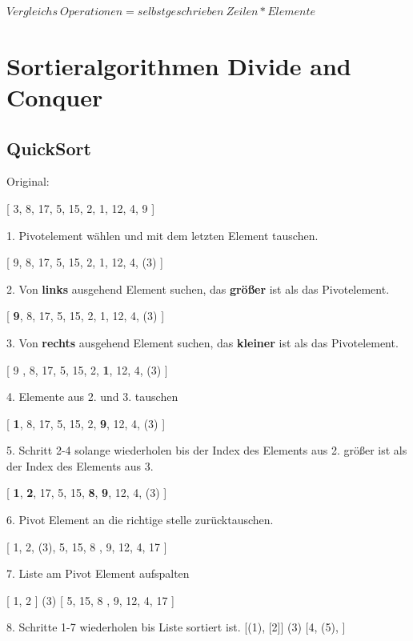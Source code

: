 \documentclass[12pt]{article}
\begin{document}
		\begin{center}
		$Vergleichs \ Operationen = selbst geschrieben \ Zeilen * Elemente$
	\end{center}
\newpage
\section{Sortieralgorithmen Divide and Conquer}
\subsection{QuickSort}
\begin{center}
	Original:
\end{center}
\vspace{-0.8cm}
 \begin{center}
 	

 [ 3, 8, 17, 5, 15, 2, 1, 12, 4, 9 ]
 \end{center}
1. Pivotelement wählen und mit dem letzten Element tauschen.
 \begin{center}
	[ 9, 8, 17, 5, 15, 2, 1, 12, 4, (3) ]
\end{center}
2. Von \textbf{links} ausgehend Element suchen, das \textbf{größer} ist als das Pivotelement.

 \begin{center}
	[ \textbf{9}, 8, 17, 5, 15, 2, 1, 12, 4, (3) ]
\end{center}

3. Von \textbf{rechts} ausgehend Element suchen, das \textbf{kleiner} ist als das Pivotelement.

\begin{center}
	[ 9 , 8, 17, 5, 15, 2, \textbf{1}, 12, 4, (3) ]
\end{center}




4. Elemente aus 2. und 3. tauschen
\begin{center}
	[ \textbf{1}, 8, 17, 5, 15, 2, \textbf{9}, 12, 4, (3) ]
\end{center}

5. Schritt 2-4 solange wiederholen bis der Index des Elements aus 2. größer ist als der Index des Elements aus 3.

\begin{center}
	[ \textbf{1}, \textbf{2}, 17, 5, 15, \textbf{8}, \textbf{9}, 12, 4, (3) ]
\end{center}

6. Pivot Element an die richtige stelle zurücktauschen.

\begin{center}
	[ 1, 2, (3), 5, 15, 8 , 9, 12, 4, 17 ]
\end{center}

7. Liste am Pivot Element aufspalten

\begin{center}
	[ 1, 2 ] (3) [ 5, 15, 8 , 9, 12, 4, 17 ]
\end{center}

8. Schritte 1-7 wiederholen bis Liste sortiert ist.
	[(1),  [2]] (3) [4, (5), ]
\end{document}
